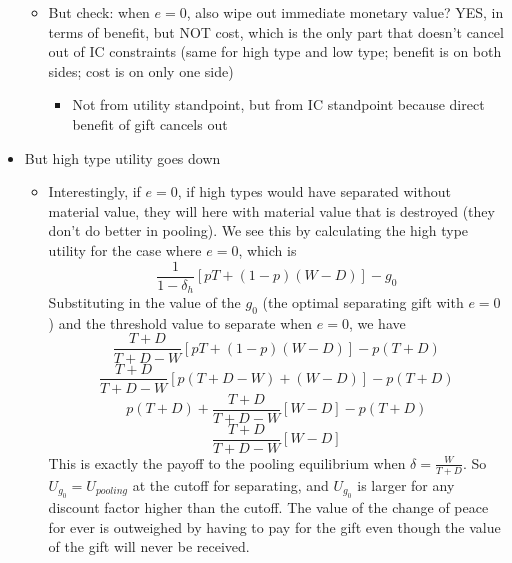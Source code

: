 \documentclass[12pt]{article}
\newcommand{\de}{\delta}
\begin{document}
\begin{itemize}
		\begin{itemize}
			\item But check: when $e=0$, also wipe out immediate monetary value? YES, in terms of benefit, but NOT cost, which is the only part that doesn't cancel out of IC constraints (same for high type and low type; benefit is on both sides; cost is on only one side)
				\begin{itemize}
					\item Not from utility standpoint, but from IC standpoint because direct benefit of gift cancels out
				\end{itemize}
		\end{itemize}
	\item But high type utility goes down
		\begin{itemize}
			\item Interestingly, if $e=0$, if high types would have separated without material value, they will here with material value that is destroyed (they don't do better in pooling). We see this by calculating the high type utility for the case where $e=0$, which is
				\[
				  \frac{1}{1-\de_h}\left[pT + (1-p)(W-D) \right] - g_0
				\]
				Substituting in the value of the $g_0$ (the optimal separating gift with $e=0$) and the threshold value to separate when $e=0$, we have
				\[
				  \frac{T+D}{T+D-W}\left[pT + (1-p)(W-D) \right] - p(T+D)
				\]
				\[
				  \frac{T+D}{T+D-W}\left[p(T +D -W) + (W-D) \right] - p(T+D)
				\]
				\[
				  p(T+D) + \frac{T+D}{T+D-W}\left[W-D \right] - p(T+D)
				\]
				\[
				  \frac{T+D}{T+D-W}\left[W-D \right]
				\]
				This is exactly the payoff to the pooling equilibrium when $\de = \frac{W}{T+D}$. So $U_{g_0} = U_{pooling}$ at the cutoff for separating, and $U_{g_0}$ is larger for any discount factor higher than the cutoff. The value of the change of peace for ever is outweighed by having to pay for the gift even though the value of the gift will never be received.
		\end{itemize}
\end{itemize}
\end{document}
